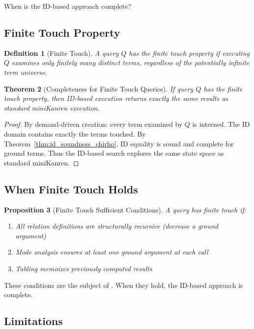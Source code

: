 \documentclass[11pt,a4paper]{article}
\newtheorem{theorem}{Theorem}
\newtheorem{definition}[theorem]{Definition}
\newtheorem{proposition}[theorem]{Proposition}
\begin{document}
When is the ID-based approach complete?

\subsection{Finite Touch Property}

\begin{definition}[Finite Touch]
\label{def:finite_touch_chirho}
A query $Q$ has the \emph{finite touch property} if executing $Q$ examines only
finitely many distinct terms, regardless of the potentially infinite term universe.
\end{definition}

\begin{theorem}[Completeness for Finite Touch Queries]
\label{thm:completeness_finite_chirho}
If query $Q$ has the finite touch property, then ID-based execution returns exactly
the same results as standard miniKanren execution.
\end{theorem}

\begin{proof}
By demand-driven creation: every term examined by $Q$ is interned.
The ID domain contains exactly the terms touched.
By Theorem~\ref{thm:id_soundness_chirho}, ID equality is sound and complete for
ground terms.
Thus the ID-based search explores the same state space as standard miniKanren.
\end{proof}

\subsection{When Finite Touch Holds}

\begin{proposition}[Finite Touch Sufficient Conditions]
\label{prop:finite_touch_conditions_chirho}
A query has finite touch if:
\begin{enumerate}
  \item All relation definitions are structurally recursive (decrease a ground argument)
  \item Mode analysis ensures at least one ground argument at each call
  \item Tabling memoizes previously computed results
\end{enumerate}
\end{proposition}

These conditions are the subject of \paperD.
When they hold, the ID-based approach is complete.

\subsection{Limitations}
\end{document}
